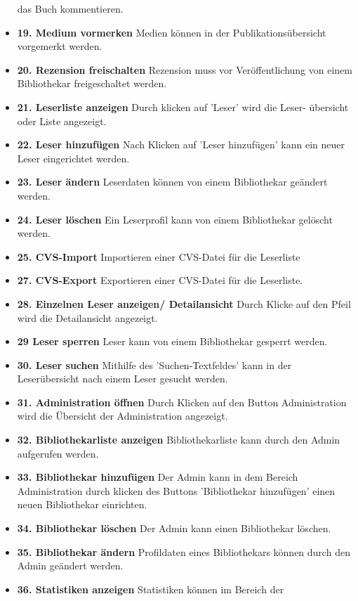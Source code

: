\documentclass[fontsize=12pt,paper=a4,twoside]{scrartcl}
\begin{document}
\begin{itemize}
  das Buch kommentieren.
  \item \textbf{19. Medium vormerken}
  Medien können in der Publikationsübersicht    
  vorgemerkt werden.
  \item \textbf{20. Rezension freischalten}
  Rezension muss vor Veröffentlichung von einem
  Bibliothekar freigeschaltet werden.
  \item \textbf{21. Leserliste anzeigen}
  Durch klicken auf 'Leser' wird die Leser-  
  übersicht oder Liste angezeigt.
  \item \textbf{22. Leser hinzufügen}
  Nach Klicken auf 'Leser hinzufügen'
  kann ein neuer Leser eingerichtet
  werden.
  \item \textbf{23. Leser ändern}
  Leserdaten können von einem 
  Bibliothekar geändert werden.
  \item \textbf{24. Leser löschen}
  Ein Leserprofil kann von einem Bibliothekar 
  gelöscht werden.
  \item \textbf{25. CVS-Import}
  Importieren einer CVS-Datei für 
  die Leserliste
  \item \textbf{27. CVS-Export}
  Exportieren einer CVS-Datei für 
  die Leserliste.
  \item \textbf{28. Einzelnen Leser anzeigen/  
  Detailansicht}
  Durch Klicke auf den Pfeil wird die 
  Detailansicht angezeigt.
  \item \textbf{29  Leser sperren}
  Leser kann von einem Bibliothekar gesperrt
  werden.
  \item \textbf{30. Leser suchen}
  Mithilfe des 'Suchen-Textfeldes' kann
  in der Leserübersicht nach einem Leser 
  gesucht werden.
  \item \textbf{31. Administration öffnen}
  Durch Klicken auf den Button Administration 
  wird die Übersicht der Administration 
  angezeigt.
  \item \textbf{32. Bibliothekarliste anzeigen}
  Bibliothekarliste kann durch den Admin 
  aufgerufen werden.
  \item \textbf{33. Bibliothekar hinzufügen}
  Der Admin kann in dem Bereich Administration
  durch klicken des Buttons 'Bibliothekar
  hinzufügen' einen neuen Bibliothekar 
  einrichten.
  \item \textbf{34. Bibliothekar löschen}
  Der Admin kann einen Bibliothekar löschen.
  \item \textbf{35. Bibliothekar ändern}
  Profildaten eines Bibliothekars können durch 
  den Admin geändert werden.
  \item \textbf{36. Statistiken anzeigen}
  Statistiken können im Bereich der       

\end{itemize}
\end{document}
